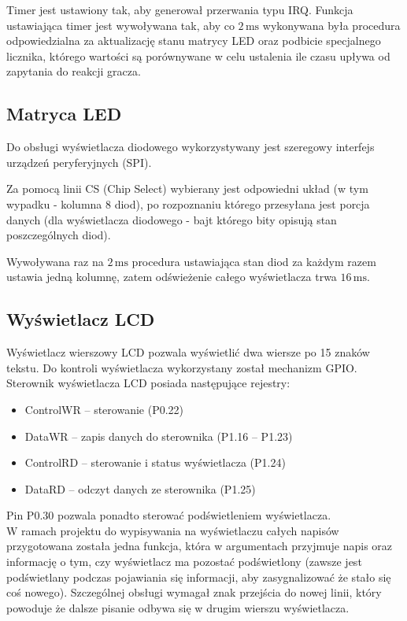 \documentclass[a4paper, portrait,11pt]{article}
\begin{document}
Timer jest ustawiony tak, aby generował przerwania typu
IRQ. Funkcja ustawiająca timer jest wywoływana tak, aby
co $2\,\mbox{ms}$ wykonywana była procedura odpowiedzialna
za aktualizację stanu matrycy LED oraz podbicie specjalnego
licznika, którego wartości są porównywane w celu ustalenia
ile czasu upływa od zapytania do reakcji gracza.

\subsection{Matryca LED}
Do obsługi wyświetlacza diodowego wykorzystywany jest
szeregowy interfejs urządzeń peryferyjnych (SPI).

Za pomocą linii CS (Chip Select) wybierany jest odpowiedni
układ (w tym wypadku - kolumna 8 diod), po rozpoznaniu którego
przesyłana jest porcja danych (dla wyświetlacza diodowego - bajt
którego bity opisują stan poszczególnych diod).

Wywoływana raz na $2\,\mbox{ms}$ procedura ustawiająca stan diod
za każdym razem ustawia jedną kolumnę, zatem odświeżenie całego
wyświetlacza trwa $16\,\mbox{ms}$.

\subsection{Wyświetlacz LCD}
Wyświetlacz wierszowy LCD pozwala wyświetlić dwa wiersze po
15 znaków tekstu. Do kontroli wyświetlacza wykorzystany
został mechanizm GPIO. Sterownik wyświetlacza LCD
posiada następujące rejestry:

\begin{itemize}
\item ControlWR – sterowanie (P0.22)
\item DataWR – zapis danych do sterownika (P1.16 – P1.23)
\item ControlRD – sterowanie i status wyświetlacza (P1.24)
\item DataRD – odczyt danych ze sterownika (P1.25)
\end{itemize}

Pin P0.30 pozwala ponadto sterować podświetleniem wyświetlacza.\\

W ramach projektu do wypisywania na wyświetlaczu całych napisów
przygotowana została jedna funkcja, która w argumentach
przyjmuje napis oraz informację o tym, czy wyświetlacz
ma pozostać podświetlony (zawsze jest podświetlany podczas
pojawiania się informacji, aby zasygnalizować że stało
się coś nowego). Szczególnej obsługi wymagał znak
przejścia do nowej linii, który powoduje że dalsze pisanie
odbywa się w drugim wierszu wyświetlacza.
\end{document}
